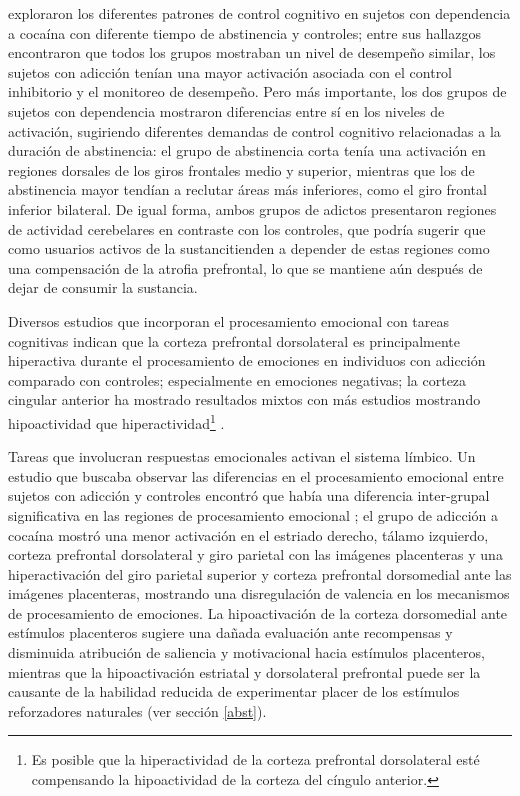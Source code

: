 \textcite{Connolly2012} exploraron los diferentes patrones de control cognitivo en sujetos con dependencia a cocaína con diferente tiempo de abstinencia y controles;
entre sus hallazgos encontraron que todos los grupos mostraban un nivel de desempeño similar, los sujetos con adicción tenían una mayor activación asociada con el control inhibitorio y el monitoreo de desempeño. Pero más importante, los dos grupos de sujetos con dependencia mostraron diferencias entre sí en los niveles de activación, sugiriendo diferentes demandas de control cognitivo relacionadas a la duración de abstinencia: el grupo de abstinencia corta tenía una activación en regiones dorsales de los giros frontales medio y superior, mientras que los de abstinencia mayor tendían a reclutar áreas más inferiores, como el giro frontal inferior bilateral.
De igual forma, ambos grupos de adictos presentaron regiones de actividad cerebelares en contraste con los controles, que podría sugerir que como usuarios activos de la sustancitienden a depender de estas regiones como una compensación de la atrofia prefrontal, lo que se mantiene aún después de dejar de consumir la sustancia. \par
Diversos estudios que incorporan el procesamiento emocional con tareas cognitivas indican que la corteza prefrontal dorsolateral es principalmente hiperactiva durante el procesamiento de emociones en individuos con adicción comparado con controles; especialmente en emociones negativas; la corteza cingular anterior ha mostrado resultados mixtos \textemdash{}con más estudios mostrando hipoactividad que hiperactividad\footnote{Es posible que la hiperactividad de la corteza prefrontal dorsolateral esté compensando la hipoactividad de la corteza del cíngulo anterior.} \parencite{Goldstein2012a}.\par
Tareas que involucran respuestas emocionales activan el sistema límbico. Un estudio que buscaba observar las diferencias en el procesamiento emocional entre sujetos con adicción y controles encontró que había una diferencia inter-grupal significativa en las regiones de procesamiento emocional \parencite{Asensio2010}; el grupo de adicción a cocaína mostró una menor activación en el estriado derecho, tálamo izquierdo, corteza prefrontal dorsolateral y giro parietal con las imágenes placenteras y una hiperactivación del giro parietal superior y corteza prefrontal dorsomedial ante las imágenes placenteras, mostrando una disregulación de valencia en los mecanismos de procesamiento de emociones.
La hipoactivación de la corteza dorsomedial ante estímulos placenteros sugiere una dañada evaluación ante recompensas y disminuida atribución de saliencia y motivacional hacia estímulos placenteros, mientras que la hipoactivación estriatal y dorsolateral prefrontal puede ser la causante de la habilidad reducida de experimentar placer de los estímulos reforzadores naturales (ver sección \ref{abst}).

